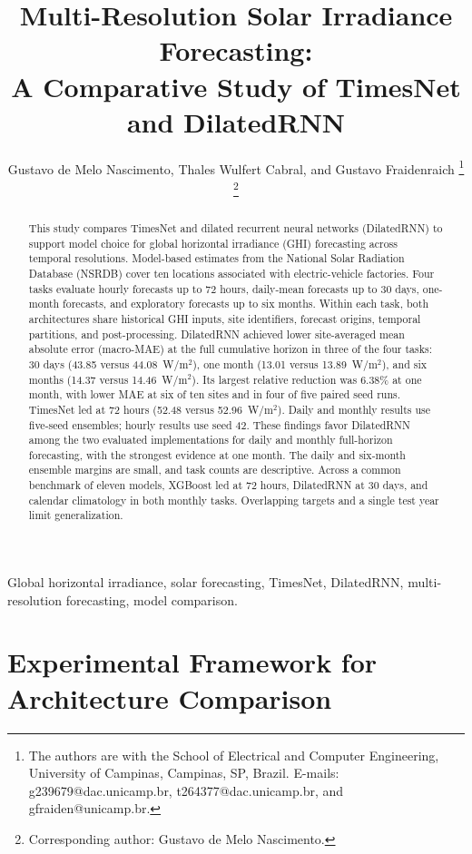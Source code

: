 \documentclass[10pt,journal]{IEEEtran}
\title{Multi-Resolution Solar Irradiance Forecasting:\\
A Comparative Study of TimesNet and DilatedRNN}
\author{Gustavo de Melo Nascimento, Thales Wulfert Cabral, and Gustavo Fraidenraich%
\thanks{The authors are with the School of Electrical and Computer Engineering,
University of Campinas, Campinas, SP, Brazil. E-mails: g239679@dac.unicamp.br,
t264377@dac.unicamp.br, and gfraiden@unicamp.br.}%
\thanks{Corresponding author: Gustavo de Melo Nascimento.}}
\begin{document}
\maketitle

\begin{abstract}
This study compares TimesNet and dilated recurrent neural networks
(DilatedRNN) to support model choice for global horizontal irradiance (GHI)
forecasting across temporal resolutions. Model-based estimates from the
National Solar Radiation Database (NSRDB) cover ten locations associated
with electric-vehicle factories. Four tasks evaluate hourly forecasts up to
72 hours, daily-mean forecasts up to 30 days, one-month forecasts, and
exploratory forecasts up to six months. Within each task, both architectures
share historical GHI inputs, site identifiers, forecast origins, temporal
partitions, and post-processing. DilatedRNN achieved lower site-averaged
mean absolute error (macro-MAE) at the full cumulative horizon in three
of the four tasks: 30 days (43.85 versus 44.08~W/m$^2$), one month
(13.01 versus 13.89~W/m$^2$), and six months
(14.37 versus 14.46~W/m$^2$). Its largest relative reduction was
6.38\% at one month, with lower MAE at six of ten sites and in four of five
paired seed runs. TimesNet led at 72 hours
(52.48 versus 52.96~W/m$^2$). Daily and monthly results use five-seed
ensembles; hourly results use seed 42. These findings favor DilatedRNN
among the two evaluated implementations for daily and monthly full-horizon
forecasting, with the strongest evidence at one month. The daily and
six-month ensemble margins are small, and task counts are descriptive.
Across a common benchmark of eleven models, XGBoost led at 72 hours,
DilatedRNN at 30 days, and calendar climatology in both monthly tasks.
Overlapping targets and a single test year limit generalization.
\end{abstract}

\begin{IEEEkeywords}
Global horizontal irradiance, solar forecasting, TimesNet, DilatedRNN,
multi-resolution forecasting, model comparison.
\end{IEEEkeywords}





\section{Experimental Framework for Architecture Comparison}
\label{sec:proposed_approach}




\end{document}
